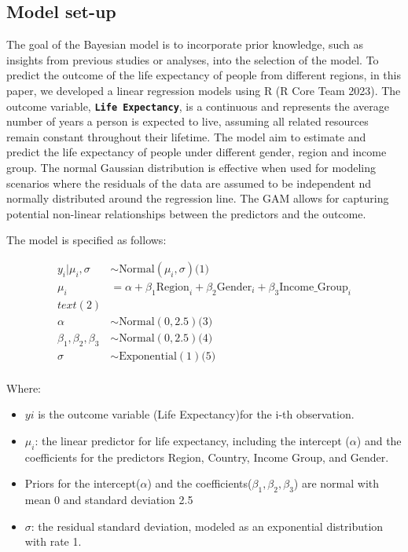 \documentclass[
  letterpaper,
  DIV=11,
  numbers=noendperiod]{scrartcl}
\begin{document}
\subsection{Model set-up}\label{sec-modset}

The goal of the Bayesian model is to incorporate prior knowledge, such
as insights from previous studies or analyses, into the selection of the
model. To predict the outcome of the life expectancy of people from
different regions, in this paper, we developed a linear regression
models using R (R Core Team 2023). The outcome variable,
\textbf{\texttt{Life\ Expectancy}}, is a continuous and represents the
average number of years a person is expected to live, assuming all
related resources remain constant throughout their lifetime. The model
aim to estimate and predict the life expectancy of people under
different gender, region and income group. The normal Gaussian
distribution is effective when used for modeling scenarios where the
residuals of the data are assumed to be independent nd normally
distributed around the regression line. The GAM allows for capturing
potential non-linear relationships between the predictors and the
outcome.

The model is specified as follows:

\begin{align} 
y_i|\mu_i, \sigma &\sim \text{Normal}(\mu_i, \sigma) \text{(1)} \\
\mu_i &= \alpha + \beta_1 \text{Region}_i + \beta_2 \text{Gender}_i + \beta_3 \text{Income_Group}_i \\text{(2)} \\
\alpha &\sim \text{Normal}(0, 2.5) \text{(3)}\\
\beta_1, \beta_2, \beta_3 &\sim \text{Normal}(0, 2.5) \text{(4)}\\
\sigma &\sim \text{Exponential}(1) \text{(5)} \\
\end{align}

Where:

\begin{itemize}
\item
  \(yi\) is the outcome variable (Life Expectancy)for the i-th
  observation.
\item
  \(\mu_i\): the linear predictor for life expectancy, including the
  intercept (\(\alpha\)) and the coefficients for the predictors Region,
  Country, Income Group, and Gender.
\item
  Priors for the intercept(\(\alpha\)) and the
  coefficients(\(\beta_1, \beta_2, \beta_3\)) are normal with mean 0 and
  standard deviation 2.5
\item
  \(\sigma\): the residual standard deviation, modeled as an exponential
  distribution with rate 1.
\end{itemize}
\end{document}
